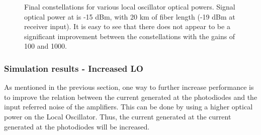 \begin{figure}[h]
\begin{minipage}{0.33\textwidth}
	\end{minipage}
	\caption{Final constellations for various local oscillator optical 
		powers. Signal optical power at is -15 
		dBm, with 20 km of fiber length (-19 dBm at receiver 
		input). It is easy to see that there does not appear to be a significant 
		improvement between the constellations with the gains of 100 and 
		1000.}\label{fig:sim_eNoise_consts}
\end{figure}

\clearpage


\subsubsection{Simulation results - Increased LO}\label{sec:simRes_incLO}

As mentioned in the previous section, one way to further increase performance 
is to improve the relation between the current generated at the photodiodes and 
the input referred noise of the amplifiers. This can be done by using a higher 
optical power on the Local Oscillator. Thus, the current generated at the 
current generated at the photodiodes will be increased.

